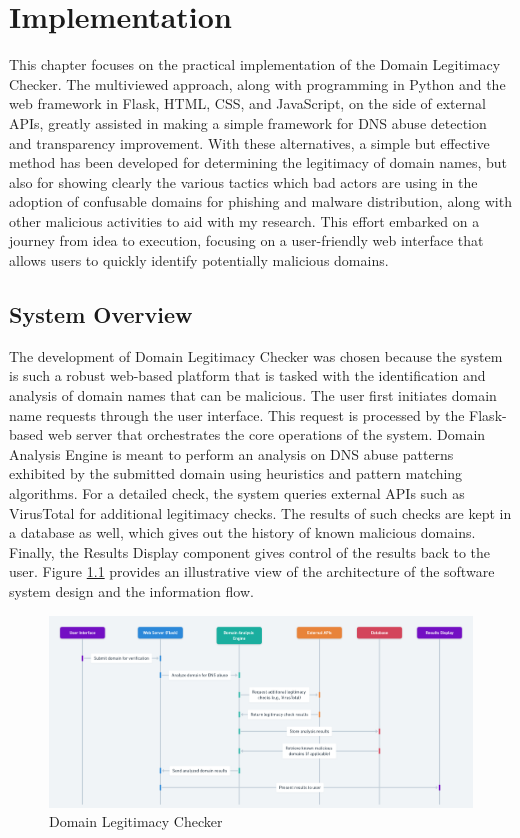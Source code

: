 \chapter{Implementation}


This chapter focuses on the practical implementation of the Domain Legitimacy Checker. The multiviewed approach, along with programming in Python and the web framework in Flask, HTML, CSS, and JavaScript, on the side of external APIs, greatly assisted in making a simple framework for DNS abuse detection and transparency improvement. With these alternatives, a simple but effective method has been developed for determining the legitimacy of domain names, but also for showing clearly the various tactics which bad actors are using in the adoption of confusable domains for phishing and malware distribution, along with other malicious activities to aid with my research. This effort embarked on a journey from idea to execution, focusing on a user-friendly web interface that allows users to quickly identify potentially malicious domains. 

\section{System Overview}

The development of Domain Legitimacy Checker was chosen because the system is such a robust web-based platform that is tasked with the identification and analysis of domain names that can be malicious. The user first initiates domain name requests through the user interface. This request is processed by the Flask-based web server that orchestrates the core operations of the system. Domain Analysis Engine is meant to perform an analysis on DNS abuse patterns exhibited by the submitted domain using heuristics and pattern matching algorithms. For a detailed check, the system queries external APIs such as VirusTotal for additional legitimacy checks. The results of such checks are kept in a database as well, which gives out the history of known malicious domains. Finally, the Results Display component gives control of the results back to the user. Figure \ref{fig:figfig} provides an illustrative view of the architecture of the software system design and the information flow.


\begin{figure}[H]
\captionsetup{font= footnotesize}
    \centering
    \includegraphics[width=1\linewidth]{project/DNS Abuse Transparency System.png}
    \caption{Domain Legitimacy Checker}
    \label{fig:figfig}
\end{figure}

